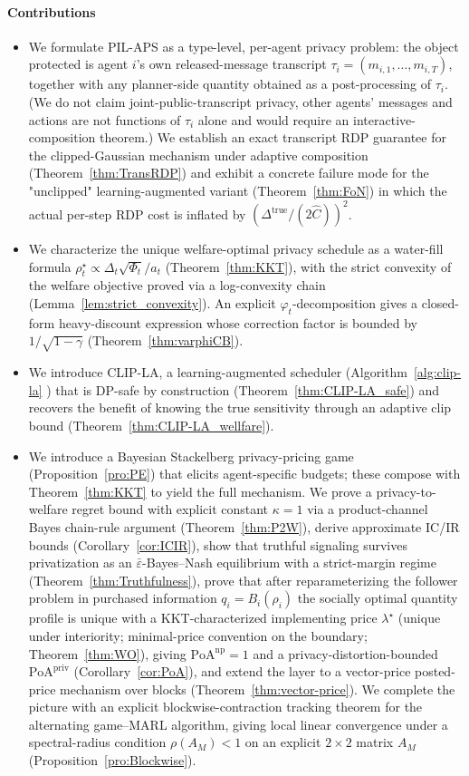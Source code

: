 \documentclass{article}
\begin{document}
\paragraph{Contributions}
\begin{itemize}
    \item We formulate PIL-APS as a type-level, per-agent privacy problem: the object protected is agent $i$'s own released-message transcript $\tau_i = (m_{i,1}, \ldots, m_{i,T})$, together with any planner-side quantity obtained as a post-processing of $\tau_i$. (We do not claim joint-public-transcript privacy, other agents' messages and actions are not functions of $\tau_i$ alone and would require an interactive-composition theorem.) We establish an exact transcript RDP guarantee for the clipped-Gaussian mechanism under adaptive composition (Theorem~\ref{thm:TransRDP}) and exhibit a concrete failure mode for the "unclipped" learning-augmented variant (Theorem~\ref{thm:FoN}) in which the actual per-step RDP cost is inflated by $(\Delta^{\mathrm{true}}/(2\hat C))^2$.
    \item We characterize the unique welfare-optimal privacy schedule as a water-fill formula $\rho_t^\star \propto \Delta_t \sqrt{\Phi_t}/a_t$ (Theorem~\ref{thm:KKT}), with the strict convexity of the welfare objective proved via a log-convexity chain (Lemma~\ref{lem:strict_convexity}). An explicit $\varphi_t$-decomposition gives a closed-form heavy-discount expression whose correction factor is bounded by $1/\sqrt{1-\gamma}$ (Theorem~\ref{thm:varphiCB}).
    \item We introduce CLIP-LA, a learning-augmented scheduler (Algorithm~\ref{alg:clip-la} ) that is DP-safe by construction (Theorem~\ref{thm:CLIP-LA_safe}) and recovers the benefit of knowing the true sensitivity through an adaptive clip bound (Theorem~\ref{thm:CLIP-LA_wellfare}).
    \item We introduce a Bayesian Stackelberg privacy-pricing game (Proposition~\ref{pro:PE}) that elicits agent-specific budgets; these compose with Theorem~\ref{thm:KKT} to yield the full mechanism. We prove a privacy-to-welfare regret bound with explicit constant $\kappa = 1$ via a product-channel Bayes chain-rule argument (Theorem~\ref{thm:P2W}), derive approximate IC/IR bounds (Corollary~\ref{cor:ICIR}), show that truthful signaling survives privatization as an $\bar\varepsilon$-Bayes–Nash equilibrium with a strict-margin regime (Theorem~\ref{thm:Truthfulness}), prove that after reparameterizing the follower problem in purchased information $q_i = B_i(\rho_i)$ the socially optimal quantity profile is unique with a KKT-characterized implementing price $\lambda^\star$ (unique under interiority; minimal-price convention on the boundary; Theorem~\ref{thm:WO}), giving $\mathrm{PoA}^{\mathrm{np}} = 1$ and a privacy-distortion-bounded $\mathrm{PoA}^{\mathrm{priv}}$ (Corollary~\ref{cor:PoA}), and extend the layer to a vector-price posted-price mechanism over blocks (Theorem~\ref{thm:vector-price}). We complete the picture with an explicit blockwise-contraction tracking theorem for the alternating game–MARL algorithm, giving local linear convergence under a spectral-radius condition $\rho(A_M) < 1$ on an explicit $2\times 2$ matrix $A_M$ (Proposition~\ref{pro:Blockwise}).

\end{itemize}
\end{document}
